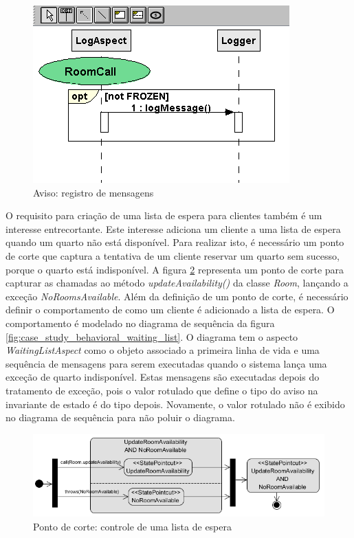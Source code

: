   \begin{figure}
	\centering
	\includegraphics{img/case_study_behavioral_log.png}
	\caption{Aviso: registro de mensagens}\label{fig:case_study_behavioral_log}
  \end{figure}

O requisito para criação de uma lista de espera para clientes também é um interesse entrecortante. Este interesse adiciona um cliente a uma lista de
espera quando um quarto não está disponível. Para realizar isto, é necessário um ponto de corte que captura a tentativa de um cliente reservar um
quarto sem sucesso, porque o quarto está indisponível. A figura \ref{fig:case_study_behavioral_pointcut_waiting_list} representa um ponto de corte
para capturar as chamadas ao método \textit{updateAvailability()} da classe \textit{Room}, lançando a exceção \textit{NoRoomsAvailable}. Além da
definição de um ponto de corte, é necessário definir o comportamento de como um cliente é adicionado a lista de espera. O comportamento é modelado no
diagrama de sequência da figura \ref{fig:case_study_behavioral_waiting_list}. O diagrama tem o aspecto \textit{WaitingListAspect} como o objeto
associado a primeira linha de vida e uma sequência de mensagens para serem executadas quando o sistema lança uma exceção de quarto indisponível. Estas
mensagens são executadas depois do tratamento de exceção, pois o valor rotulado que define o tipo do aviso na invariante de estado é do tipo depois.
Novamente, o valor rotulado não é exibido no diagrama de sequência para não poluir o diagrama.

  \begin{figure}[tb]
	\centering
	\includegraphics[scale=0.8]{img/case_study_behavioral_pointcut_waiting_list.png}
	\caption{Ponto de corte: controle de uma lista de espera}\label{fig:case_study_behavioral_pointcut_waiting_list}
  \end{figure}
  
